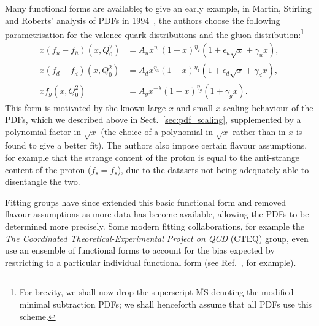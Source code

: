 \documentclass[withindex,glossary]{cam-thesis}
\begin{document}
Many functional forms are available; to give an early example, in Martin, Stirling and Roberts' analysis of PDFs in 1994~\cite{Martin:1994kn}, the authors choose the following parametrisation for the valence quark distributions and the gluon distribution:\footnote{For brevity, we shall now drop the superscript $\overline{\text{MS}}$ denoting the modified minimal subtraction PDFs; we shall henceforth assume that all PDFs use this scheme.}
\begin{align}
x(f_u - f_{\bar{u}})(x,Q_0^2) &= A_u x^{\eta_1} (1-x)^{\eta_2} (1 + \epsilon_u \sqrt{x} + \gamma_u x),\\
x(f_d - f_{\bar{d}})(x,Q_0^2) &= A_d x^{\eta_3} (1-x)^{\eta_4} (1 + \epsilon_d \sqrt{x} + \gamma_d x),\\
xf_g(x,Q_0^2) &= A_g x^{-\lambda} (1-x)^{\eta_g} (1 + \gamma_g x).
\end{align}
This form is motivated by the known large-$x$ and small-$x$ scaling behaviour of the PDFs, which we described above in Sect.~\ref{sec:pdf_scaling}, supplemented by a polynomial factor in $\sqrt{x}$ (the choice of a polynomial in $\sqrt{x}$ rather than in $x$ is found to give a better fit). The authors also impose certain flavour assumptions, for example that the strange content of the proton is equal to the anti-strange content of the proton ($f_{s} = f_{\bar{s}}$), due to the datasets not being adequately able to disentangle the two.

Fitting groups have since extended this basic functional form and removed flavour assumptions as more data has become available, allowing the PDFs to be determined more precisely. Some modern fitting collaborations, for example the \textit{The Coordinated Theoretical-Experimental Project on QCD} (CTEQ) group, even use an ensemble of functional forms to account for the bias expected by restricting to a particular individual functional form (see Ref.~\cite{Hou:2019efy}, for example).
\end{document}
